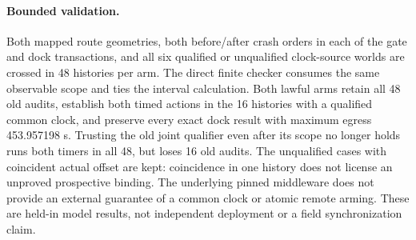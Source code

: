 \documentclass{article}
\begin{document}
\paragraph{Bounded validation.}
Both mapped route geometries, both before/after crash orders in
each of the gate and dock transactions, and all six qualified or
unqualified clock-source worlds are crossed in 48 histories
per arm. The direct finite checker consumes the same observable
scope and ties the interval calculation. Both lawful arms
retain all 48 old audits, establish both timed actions in the
16 histories with a qualified common clock, and preserve every
exact dock result with maximum egress 453.957198 s. Trusting
the old joint qualifier even after its scope no longer holds
runs both timers in all 48, but loses 16 old audits. The
unqualified cases with coincident actual offset are kept:
coincidence in one history does not license an unproved
prospective binding. The underlying pinned middleware
does not provide an external guarantee of a common
clock or atomic remote arming. These are held-in model results,
not independent deployment or a field synchronization claim.
\end{document}
